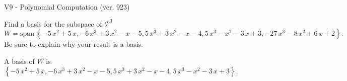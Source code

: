 \begin{exercise}
  \begin{exerciseTitle}V9 - Polynomial Computation (ver. 923)\end{exerciseTitle}
  \begin{exerciseStatement}
    Find a basis for the subspace of \(\mathcal{P}^3\) 
\[W=\mathrm{span}\ \left\{-5 \, x^{2} + 5 \, x , -6 \, x^{3} + 3 \, x^{2} - x - 5 , 5 \, x^{3} + 3 \, x^{2} - x - 4 , 5 \, x^{3} - x^{2} - 3 \, x + 3 , -27 \, x^{3} - 8 \, x^{2} + 6 \, x + 2\right\}.\]
 Be sure to explain why your result is a basis.


  \end{exerciseStatement}
  \begin{exerciseAnswer}
   A basis of \(W\) is  \(\left\{-5 \, x^{2} + 5 \, x , -6 \, x^{3} + 3 \, x^{2} - x - 5 , 5 \, x^{3} + 3 \, x^{2} - x - 4 , 5 \, x^{3} - x^{2} - 3 \, x + 3\right\}\).
  


  \end{exerciseAnswer}
\end{exercise}